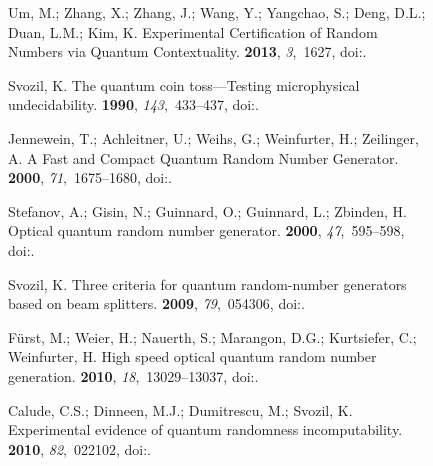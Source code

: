 \documentclass[entropy,article,accept,oneauthor,pdftex]{Definitions/mdpi}
\begin{document}
\begin{figure}[H]
\begin{thebibliography}{999}
Um, M.; Zhang, X.; Zhang, J.; Wang, Y.; Yangchao, S.; Deng, D.L.; Duan, L.M.;
  Kim, K.
\newblock Experimental Certification of Random Numbers via Quantum Contextuality.
 {\bf 2013}, {\em 3},~1627, doi:{\href{https://doi.org/10.1038/srep01627}{}}.

Svozil, K.
\newblock The quantum coin toss---Testing microphysical undecidability.
 {\bf 1990}, {\em 143},~433--437, doi:{\href{https://doi.org/10.1016/0375-9601(90)90408-G}{}}.

Jennewein, T.; Achleitner, U.; Weihs, G.; Weinfurter, H.; Zeilinger, A.
\newblock A Fast and Compact Quantum Random Number Generator.
 {\bf 2000}, {\em 71},~1675--1680, doi:{\href{https://doi.org/10.1063/1.1150518}{}}.

Stefanov, A.; Gisin, N.; Guinnard, O.; Guinnard, L.; Zbinden, H.
\newblock Optical quantum random number generator.
 {\bf 2000}, {\em 47},~595--598, doi:{\href{https://doi.org/10.1080/095003400147908}{}}.

Svozil, K.
\newblock Three criteria for quantum random-number generators based on beam
  splitters.
 {\bf 2009}, {\em 79},~054306, doi:{\href{https://doi.org/10.1103/PhysRevA.79.054306}{}}.

F\"{u}rst, M.; Weier, H.; Nauerth, S.; Marangon, D.G.; Kurtsiefer, C.;
  Weinfurter, H.
\newblock High speed optical quantum random number generation.
 {\bf 2010}, {\em 18},~13029--13037, doi:{\href{https://doi.org/10.1364/OE.18.013029}{}}.

Calude, C.S.; Dinneen, M.J.; Dumitrescu, M.; Svozil, K.
\newblock Experimental evidence of quantum randomness incomputability.
 {\bf 2010}, {\em 82},~022102, doi:{\href{https://doi.org/10.1103/PhysRevA.82.022102}{}}.


\end{thebibliography}
\end{figure}
\end{document}
